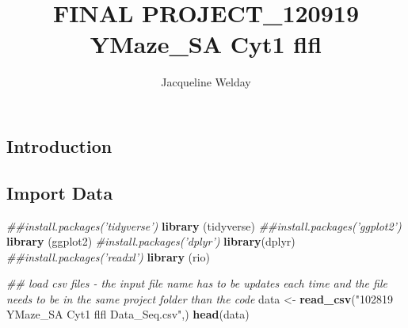 \documentclass[]{article}
\title{FINAL PROJECT\_120919 YMaze\_SA Cyt1 flfl}
\author{Jacqueline Welday}
\date{}
\newenvironment{Shaded}{\begin{snugshade}}{\end{snugshade}}
\newcommand{\CommentTok}[1]{\textcolor[rgb]{0.56,0.35,0.01}{\textit{#1}}}
\newcommand{\KeywordTok}[1]{\textcolor[rgb]{0.13,0.29,0.53}{\textbf{#1}}}
\newcommand{\NormalTok}[1]{#1}
\newcommand{\StringTok}[1]{\textcolor[rgb]{0.31,0.60,0.02}{#1}}
\begin{document}
\maketitle

\hypertarget{introduction}{%
\subsection{Introduction}\label{introduction}}

\hypertarget{import-data}{%
\subsection{Import Data}\label{import-data}}

\begin{Shaded}
\begin{Highlighting}[]
\CommentTok{##install.packages('tidyverse')}
\KeywordTok{library}\NormalTok{ (tidyverse)}
\CommentTok{##install.packages('ggplot2')}
\KeywordTok{library}\NormalTok{ (ggplot2)}
\CommentTok{#install.packages('dplyr')}
\KeywordTok{library}\NormalTok{(dplyr)}
\CommentTok{##install.packages('readxl')}
\KeywordTok{library}\NormalTok{ (rio)}

\CommentTok{## load csv files - the input file name has to be updates each time and the file needs to be in the same project folder than the code}
\NormalTok{data <-}\StringTok{ }\KeywordTok{read_csv}\NormalTok{(}\StringTok{"102819 YMaze_SA Cyt1 flfl Data_Seq.csv"}\NormalTok{,)}
\KeywordTok{head}\NormalTok{(data)}
\end{Highlighting}
\end{Shaded}
\end{document}
